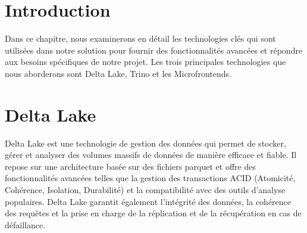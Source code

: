 
\section*{Introduction}
Dans ce chapitre, nous examinerons en détail les technologies clés qui sont utilisées dans notre solution pour fournir des fonctionnalités avancées et répondre aux besoins spécifiques de notre projet. Les trois principales technologies que nous aborderons sont Delta Lake, Trino et les Microfrontends.

\section{Delta Lake}

Delta Lake est une technologie de gestion des données qui permet de stocker, gérer et analyser des volumes massifs de données de manière efficace et fiable. Il repose sur une architecture basée sur des fichiers parquet et offre des fonctionnalités avancées telles que la gestion des transactions ACID (Atomicité, Cohérence, Isolation, Durabilité) et la compatibilité avec des outils d'analyse populaires. Delta Lake garantit également l'intégrité des données, la cohérence des requêtes et la prise en charge de la réplication et de la récupération en cas de défaillance.


